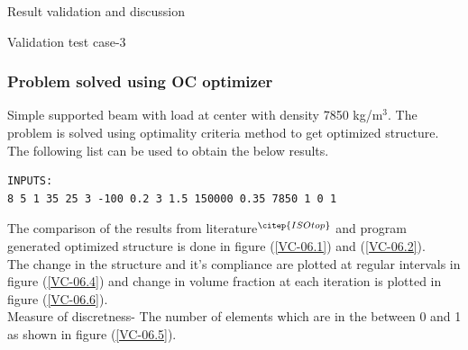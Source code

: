 \documentclass[a4paper,12pt,times]{article}
\begin{document}
\begin{section}{Result validation and discussion}
\begin{subsection}{Validation test case-3}
\begin{figure}[H]
\label{VC-05.4}
\end{figure}

\subsubsection{Problem solved using OC optimizer}
Simple supported beam with load at center with density 7850 kg/m$^3$. The problem is solved using optimality criteria method to get optimized structure. The following list can be used to obtain the below results.\\
\begin{lstlisting}
INPUTS:
8 5 1 35 25 3 -100 0.2 3 1.5 150000 0.35 7850 1 0 1
\end{lstlisting}
The comparison of the results from literature$^{\citep{ISOtop}}$ and program generated optimized structure is done in figure (\ref{VC-06.1}) and (\ref{VC-06.2}).\\
The change in the structure and it's compliance are plotted at regular intervals in figure (\ref{VC-06.4}) and change in volume fraction at each iteration is plotted in figure (\ref{VC-06.6}).\\
Measure of discretness- The number of elements which are in the between 0 and 1 as shown in figure (\ref{VC-06.5}).\\
 

\end{subsection}
\end{section}
\end{document}

